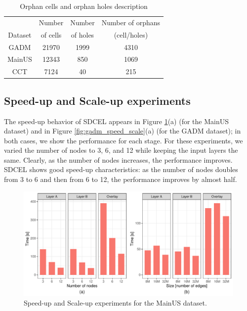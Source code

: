 \begin{table}
    \centering
    \small
    \caption{Orphan cells and orphan holes description}\label{tab:orphans}
    \begin{tabular}{c c c c}
        \toprule
                & Number   & Number   & Number of orphans   \\
        Dataset & of cells & of holes & (cell/holes) \\
        \midrule
        GADM  & 21970      & 1999     & 4310 \\
        MainUS& 12343      & 850      & 1069 \\
        CCT   & 7124       & 40       & 215  \\
        \bottomrule
    \end{tabular}
\end{table}

\subsection{Speed-up and Scale-up experiments} \label{sec:speed_scale}
The speed-up behavior of SDCEL appears in Figure \ref{fig:mainus_speed_scale}(a) (for the MainUS dataset) and in Figure \ref{fig:gadm_speed_scale}(a) (for the GADM dataset); in both cases, we show the performance for each stage. For these experiments, we varied the number of nodes to 3, 6, and 12 while keeping the input layers the same. Clearly, as the number of nodes increases, the performance improves. SDCEL shows good speed-up characteristics: as the number of nodes doubles from 3 to 6 and then from 6 to 12, the performance improves by almost half.

\begin{figure}
    \centering
    \includegraphics[width=\textwidth]{chapterSDCEL/MainUS_SS/MainUS_SS} 
    \caption{Speed-up and Scale-up experiments for the MainUS dataset.} 
\label{fig:mainus_speed_scale}
\end{figure}

